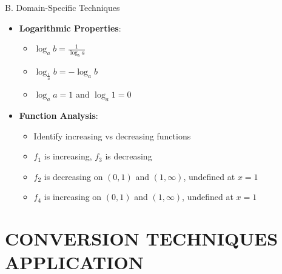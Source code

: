 \documentclass[12pt]{article}
\begin{document}
\begin{tacticalbox}{B. Domain-Specific Techniques}
\begin{itemize}[leftmargin=*]
    \item \textbf{Logarithmic Properties}:
    \begin{itemize}
        \item $\log_a b = \frac{1}{\log_b a}$
        \item $\log_{\frac{1}{a}} b = -\log_a b$
        \item $\log_a a = 1$ and $\log_a 1 = 0$
    \end{itemize}
    
    \item \textbf{Function Analysis}:
    \begin{itemize}
        \item Identify increasing vs decreasing functions
        \item $f_1$ is increasing, $f_3$ is decreasing
        \item $f_2$ is decreasing on $(0, 1)$ and $(1, \infty)$, undefined at $x = 1$
        \item $f_4$ is increasing on $(0, 1)$ and $(1, \infty)$, undefined at $x = 1$
    \end{itemize}
\end{itemize}
\end{tacticalbox}

\section{CONVERSION TECHNIQUES APPLICATION}
\end{document}
